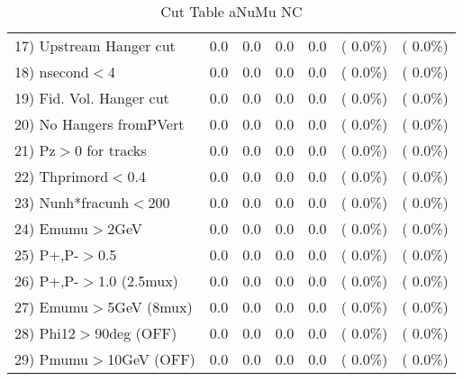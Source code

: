 \begin{table}[h!]
\begin{tabular}{||l||r|r|r|r|r|r||}
 17) Upstream Hanger cut  &          0.0 &          0.0 &          0.0 &          0.0 & (  0.0\%) & (  0.0\%) \\
 18) nsecond$<$4          &          0.0 &          0.0 &          0.0 &          0.0 & (  0.0\%) & (  0.0\%) \\
 19) Fid. Vol. Hanger cut &          0.0 &          0.0 &          0.0 &          0.0 & (  0.0\%) & (  0.0\%) \\
 20) No Hangers fromPVert &          0.0 &          0.0 &          0.0 &          0.0 & (  0.0\%) & (  0.0\%) \\
 21) Pz$>$0 for tracks    &          0.0 &          0.0 &          0.0 &          0.0 & (  0.0\%) & (  0.0\%) \\
 22) Thprimord$<$0.4      &          0.0 &          0.0 &          0.0 &          0.0 & (  0.0\%) & (  0.0\%) \\
 23) Nunh*fracunh$<$200   &          0.0 &          0.0 &          0.0 &          0.0 & (  0.0\%) & (  0.0\%) \\
 24) Emumu$>$2GeV         &          0.0 &          0.0 &          0.0 &          0.0 & (  0.0\%) & (  0.0\%) \\
 25) P+,P-$>$0.5          &          0.0 &          0.0 &          0.0 &          0.0 & (  0.0\%) & (  0.0\%) \\
 26) P+,P-$>$1.0 (2.5mux) &          0.0 &          0.0 &          0.0 &          0.0 & (  0.0\%) & (  0.0\%) \\
 27) Emumu$>$5GeV  (8mux) &          0.0 &          0.0 &          0.0 &          0.0 & (  0.0\%) & (  0.0\%) \\
 28) Phi12$>$90deg  (OFF) &          0.0 &          0.0 &          0.0 &          0.0 & (  0.0\%) & (  0.0\%) \\
 29) Pmumu$>$10GeV  (OFF) &          0.0 &          0.0 &          0.0 &          0.0 & (  0.0\%) & (  0.0\%) \\
 \hline
 \hline
 \end{tabular}
 \caption{Cut Table  aNuMu NC }
 \label{tab-cutcohjpsi-mumu_anumunc}
 \end{table}
